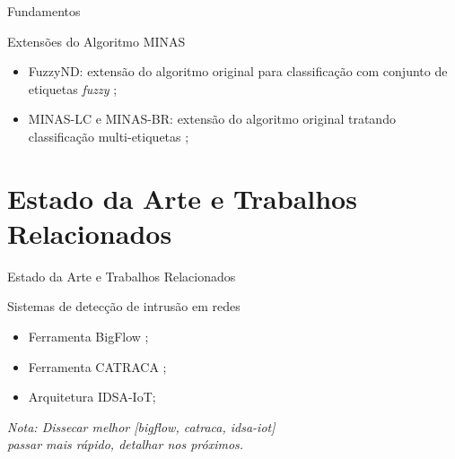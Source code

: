 \documentclass[aspectratio=43,10pt]{beamer}
\newcommand{\nota}[1]{\hspace*{-0.5cm}\textit{{\color[rgb]{1,0,0}Nota: #1}}}
\begin{document}
\begin{frame}[fragile]{Fundamentos}
  \begin{alertblock}{Extensões do Algoritmo MINAS}
    \begin{itemize}
      \item FuzzyND: extensão do algoritmo original para classificação com
      conjunto de etiquetas \emph{fuzzy} \cite{DaSilva2018,DaSilva2018thesis};
      \item MINAS-LC e MINAS-BR: extensão do algoritmo original tratando
      classificação multi-etiquetas \cite{Costa2019,Costa2019thesis};
    \end{itemize}
  \end{alertblock}
\end{frame}

\section{Estado da Arte e Trabalhos Relacionados}

\newcommand{\idsiot}{IDSA-IoT\xspace}

\begin{frame}[fragile]{Estado da Arte e Trabalhos Relacionados}
\begin{alertblock}{Sistemas de detecção de intrusão em redes}
  \begin{itemize}
    \item Ferramenta BigFlow \cite{Viegas2019};
    \item Ferramenta CATRACA \cite{Lopez2018};
    \item Arquitetura \idsiot \cite{Cassales2019a};
  \end{itemize}
\end{alertblock}
\nota{%
Dissecar melhor [bigflow, catraca, idsa-iot]\\
passar mais rápido, detalhar nos próximos.}
\end{frame}
\end{document}
